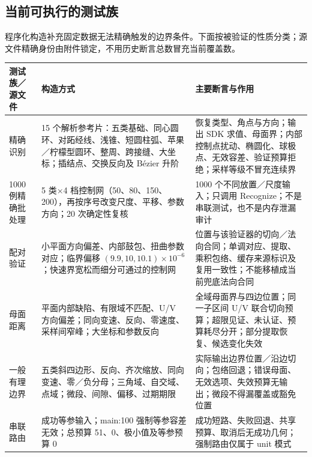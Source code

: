 \documentclass[UTF8,zihao=5,fontset=windows,a4paper]{ctexart}
\begin{document}
\subsection{当前可执行的测试族}
程序化构造补充固定数据无法精确触发的边界条件。下面按被验证的性质分类；源文件精确身份由附件锁定，不用历史断言总数冒充当前覆盖数。
\begin{center}\small\renewcommand{\arraystretch}{1.17}
\begin{tabularx}{\linewidth}{@{}p{26mm}Y Y@{}}\toprule
测试族／源文件 & 构造方式 & 主要断言与作用\\\midrule
精确识别\newline{} & 15 个解析参考片：五类基础、同心圆环、对跖经线、浅锥、短圆柱弧、苹果／柠檬型圆环、整周、跨接缝、大坐标；插结点、交换反向及 Bézier 升阶 & 恢复类型、角点与方向；输出 SDK 求值、母面界；内部控制点扰动、椭圆化、球极点、无效容差、验证预算拒绝；采样等级不冒充连续界\\
1000 例精确批处理 & 5 类×4 档控制网（50、80、150、200），再按序号改变尺度、平移、参数方向；20 次确定性复核 & 1000 个不同放置／尺度输入；只调用 Recognize；不是串联测试，也不是内存泄漏审计\\
配对验证\newline{} & 小平面方向偏差、内部鼓包、扭曲参数对应；临界偏移 $(9.9,10,10.1)\times10^{-6}$；快速界宽松而细分可通过的控制网 & 位置与该验证器的切向／法向合同；单调对应、提取、乘积包络、缓存来源标识及复用一致性；不能移植成当前兜底法向合同\\
母面距离\newline{} & 平面内部缺陷、有限域不匹配、U/V 方向偏差；同向变速、反向、零速度、采样间窄峰；大坐标和参数反向 & 全域母面界与四边位置；同一子区间 U/V 联合切向预算；超限见证、未认证、预算耗尽分开；部分提取恢复、候选变化失效\\
一般有理边界\newline{} & 五类斜四边形、反向、齐次缩放、同向变速、零／负分母；三角域、自交域、点域；微段、间隙、偏移、过期期限 & 实际输出边界位置／沿边切向；包络回退；错误母面、无效选项、失效预算无输出；微段不得漏覆盖或豁免位置\\
串联路由\newline{} & 成功等参输入；main:100 强制等参容差无效；总预算 51、0、极小值及等参预算 0 & 成功短路、失败回退、共享预算、取消后无成功几何；强制路由仅属于 unit 模式\\\bottomrule
\end{tabularx}
\end{center}
\end{document}
